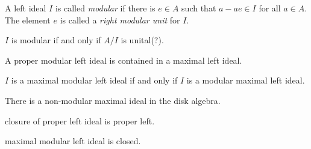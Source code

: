 \documentclass{../../large}
\begin{document}
\begin{prb}
A left ideal $I$ is called \emph{modular} if there is $e\in A$ such that $a-ae\in I$ for all $a\in A$.
The element $e$ is called a \emph{right modular unit} for $I$.
\begin{parts}
\item $I$ is modular if and only if $A/I$ is unital(?).
\item A proper modular left ideal is contained in a maximal left ideal.
\item $I$ is a maximal modular left ideal if and only if $I$ is a modular maximal left ideal.
\item There is a non-modular maximal ideal in the disk algebra.
\end{parts}
\end{prb}

\begin{prb}
\begin{parts}
\item closure of proper left ideal is proper left.
\item maximal modular left ideal is closed.
\end{parts}
\end{prb}
\end{document}
